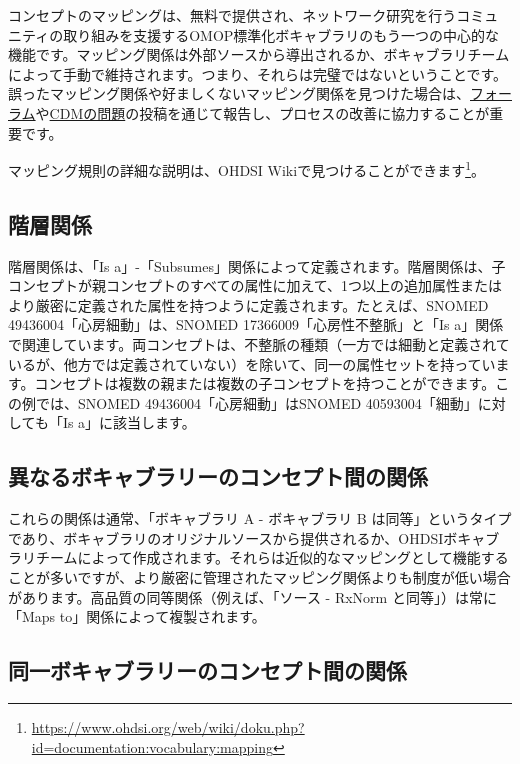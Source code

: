 \documentclass[
  11pt]{book}
\theoremstyle{definition}
\theoremstyle{definition}
\theoremstyle{definition}
\theoremstyle{definition}
\theoremstyle{remark}
\begin{document}
コンセプトのマッピングは、無料で提供され、ネットワーク研究を行うコミュニティの取り組みを支援するOMOP標準化ボキャブラリのもう一つの中心的な機能です。マッピング関係は外部ソースから導出されるか、ボキャブラリチームによって手動で維持されます。つまり、それらは完璧ではないということです。誤ったマッピング関係や好ましくないマッピング関係を見つけた場合は、\href{https://forums.ohdsi.org}{フォーラム}や\href{https://github.com/OHDSI/CommonDataModel/issues}{CDMの問題}の投稿を通じて報告し、プロセスの改善に協力することが重要です。

マッピング規則の詳細な説明は、OHDSI Wikiで見つけることができます\footnote{\url{https://www.ohdsi.org/web/wiki/doku.php?id=documentation:vocabulary:mapping}}。

\subsection{階層関係}\label{ux968eux5c64ux95a2ux4fc2}

階層関係は、「Is a」-「Subsumes」関係によって定義されます。階層関係は、子コンセプトが親コンセプトのすべての属性に加えて、1つ以上の追加属性またはより厳密に定義された属性を持つように定義されます。たとえば、SNOMED 49436004「心房細動」は、SNOMED 17366009「心房性不整脈」と「Is a」関係で関連しています。両コンセプトは、不整脈の種類（一方では細動と定義されているが、他方では定義されていない）を除いて、同一の属性セットを持っています。コンセプトは複数の親または複数の子コンセプトを持つことができます。この例では、SNOMED 49436004「心房細動」はSNOMED 40593004「細動」に対しても「Is a」に該当します。

\subsection{異なるボキャブラリーのコンセプト間の関係}\label{ux7570ux306aux308bux30dcux30adux30e3ux30d6ux30e9ux30eaux30fcux306eux30b3ux30f3ux30bbux30d7ux30c8ux9593ux306eux95a2ux4fc2}

これらの関係は通常、「ボキャブラリ A - ボキャブラリ B は同等」というタイプであり、ボキャブラリのオリジナルソースから提供されるか、OHDSIボキャブラリチームによって作成されます。それらは近似的なマッピングとして機能することが多いですが、より厳密に管理されたマッピング関係よりも制度が低い場合があります。高品質の同等関係（例えば、「ソース - RxNorm と同等」）は常に「Maps to」関係によって複製されます。

\subsection{同一ボキャブラリーのコンセプト間の関係}\label{ux540cux4e00ux30dcux30adux30e3ux30d6ux30e9ux30eaux30fcux306eux30b3ux30f3ux30bbux30d7ux30c8ux9593ux306eux95a2ux4fc2}
\end{document}
